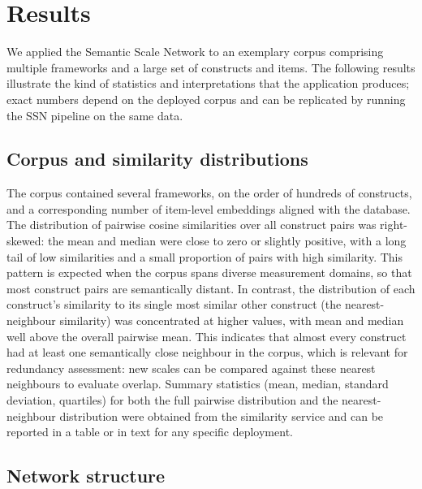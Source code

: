 \documentclass[11pt]{article}
\begin{document}
\section{Results}

We applied the Semantic Scale Network to an exemplary corpus comprising multiple frameworks and a large set of constructs and items. The following results illustrate the kind of statistics and interpretations that the application produces; exact numbers depend on the deployed corpus and can be replicated by running the SSN pipeline on the same data.

\subsection{Corpus and similarity distributions}

The corpus contained several frameworks, on the order of hundreds of constructs, and a corresponding number of item-level embeddings aligned with the database. The distribution of pairwise cosine similarities over all construct pairs was right-skewed: the mean and median were close to zero or slightly positive, with a long tail of low similarities and a small proportion of pairs with high similarity. This pattern is expected when the corpus spans diverse measurement domains, so that most construct pairs are semantically distant. In contrast, the distribution of each construct's similarity to its single most similar other construct (the nearest-neighbour similarity) was concentrated at higher values, with mean and median well above the overall pairwise mean. This indicates that almost every construct had at least one semantically close neighbour in the corpus, which is relevant for redundancy assessment: new scales can be compared against these nearest neighbours to evaluate overlap. Summary statistics (mean, median, standard deviation, quartiles) for both the full pairwise distribution and the nearest-neighbour distribution were obtained from the similarity service and can be reported in a table or in text for any specific deployment.

\subsection{Network structure}
\end{document}
